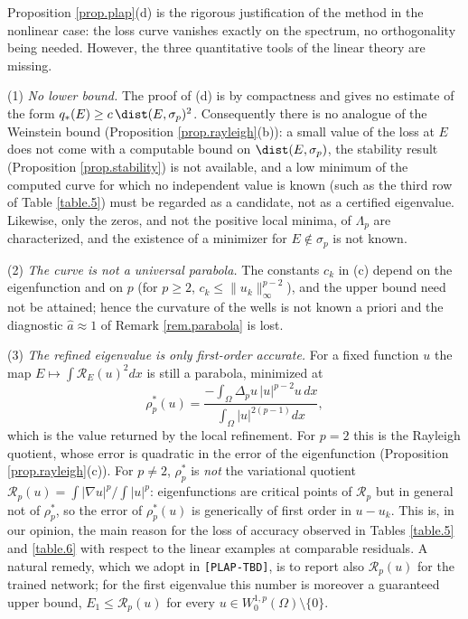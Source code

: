 \begin{remark}\label{rem.plap.lost}
Proposition \ref{prop.plap}(d) is the rigorous justification of the method in the
nonlinear case: the loss curve vanishes exactly on the spectrum, no orthogonality being
needed. However, the three quantitative tools of the linear theory are missing.

(1) \emph{No lower bound.} The proof of (d) is by compactness and gives no estimate of
the form $q_*(E)\ge c\,\dist(E,\sigma_p)^2$. Consequently there is no analogue of the
Weinstein bound (Proposition \ref{prop.rayleigh}(b)): a small value of the loss at $E$
does not come with a computable bound on $\dist(E,\sigma_p)$, the stability result
(Proposition \ref{prop.stability}) is not available, and a low minimum of the computed
curve for which no independent value is known (such as the third row of Table
\ref{table.5}) must be regarded as a candidate, not as a certified eigenvalue. Likewise,
only the zeros, and not the positive local minima, of $\Lambda_p$ are characterized, and
the existence of a minimizer for $E\notin\sigma_p$ is not known.

(2) \emph{The curve is not a universal parabola.} The constants $c_k$ in (c) depend on
the eigenfunction and on $p$ (for $p\ge2$, $c_k\le\|u_k\|_\infty^{p-2}$), and the upper
bound need not be attained; hence the curvature of the wells is not known a priori and
the diagnostic $\hat a\approx1$ of Remark \ref{rem.parabola} is lost.

(3) \emph{The refined eigenvalue is only first-order accurate.} For a fixed function $u$
the map $E\mapsto\int\mathcal R_E(u)^2dx$ is still a parabola, minimized at
\[
\rho_p^*(u)=\frac{-\int_\Omega\Delta_pu\,|u|^{p-2}u\,dx}{\int_\Omega|u|^{2(p-1)}dx},
\]
which is the value returned by the local refinement. For $p=2$ this is the Rayleigh
quotient, whose error is quadratic in the error of the eigenfunction (Proposition
\ref{prop.rayleigh}(c)). For $p\neq2$, $\rho_p^*$ is \emph{not} the variational quotient
$\mathcal R_p(u)=\int|\nabla u|^p/\int|u|^p$: eigenfunctions are critical points of
$\mathcal R_p$ but in general not of $\rho_p^*$, so the error of $\rho_p^*(u)$ is
generically of first order in $u-u_k$. This is, in our opinion, the main reason for the
loss of accuracy observed in Tables \ref{table.5} and \ref{table.6} with respect to the
linear examples at comparable residuals. A natural remedy, which we adopt in
\texttt{[PLAP-TBD]}, is to report also $\mathcal R_p(u)$ for the trained network; for
the first eigenvalue this number is moreover a guaranteed upper bound,
$E_1\le\mathcal R_p(u)$ for every $u\in W^{1,p}_0(\Omega)\setminus\{0\}$.


\end{remark}
